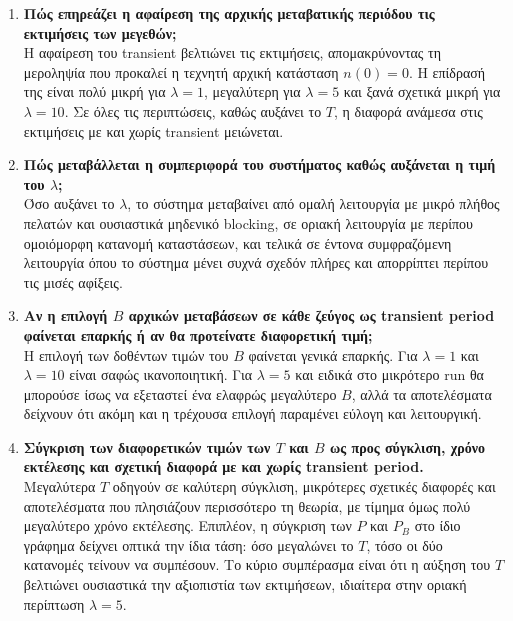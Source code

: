 \documentclass{article}
\begin{document}
\begin{enumerate}[label=\arabic*.]
    \item \textbf{Πώς επηρεάζει η αφαίρεση της αρχικής μεταβατικής περιόδου τις εκτιμήσεις των μεγεθών;}\\
    Η αφαίρεση του transient βελτιώνει τις εκτιμήσεις, απομακρύνοντας τη μεροληψία που προκαλεί η τεχνητή αρχική κατάσταση $n(0)=0$. Η επίδρασή της είναι πολύ μικρή για $\lambda=1$, μεγαλύτερη για $\lambda=5$ και ξανά σχετικά μικρή για $\lambda=10$. Σε όλες τις περιπτώσεις, καθώς αυξάνει το $T$, η διαφορά ανάμεσα στις εκτιμήσεις με και χωρίς transient μειώνεται.

    \item \textbf{Πώς μεταβάλλεται η συμπεριφορά του συστήματος καθώς αυξάνεται η τιμή του $\lambda$;}\\
    Όσο αυξάνει το $\lambda$, το σύστημα μεταβαίνει από ομαλή λειτουργία με μικρό πλήθος πελατών και ουσιαστικά μηδενικό blocking, σε οριακή λειτουργία με περίπου ομοιόμορφη κατανομή καταστάσεων, και τελικά σε έντονα συμφραζόμενη λειτουργία όπου το σύστημα μένει συχνά σχεδόν πλήρες και απορρίπτει περίπου τις μισές αφίξεις.

    \item \textbf{Αν η επιλογή $B$ αρχικών μεταβάσεων σε κάθε ζεύγος ως transient period φαίνεται επαρκής ή αν θα προτείνατε διαφορετική τιμή;}\\
    Η επιλογή των δοθέντων τιμών του $B$ φαίνεται γενικά επαρκής. Για $\lambda=1$ και $\lambda=10$ είναι σαφώς ικανοποιητική. Για $\lambda=5$ και ειδικά στο μικρότερο run θα μπορούσε ίσως να εξεταστεί ένα ελαφρώς μεγαλύτερο $B$, αλλά τα αποτελέσματα δείχνουν ότι ακόμη και η τρέχουσα επιλογή παραμένει εύλογη και λειτουργική.

    \item \textbf{Σύγκριση των διαφορετικών τιμών των $T$ και $B$ ως προς σύγκλιση, χρόνο εκτέλεσης και σχετική διαφορά με και χωρίς transient period.}\\
    Μεγαλύτερα $T$ οδηγούν σε καλύτερη σύγκλιση, μικρότερες σχετικές διαφορές και αποτελέσματα που πλησιάζουν περισσότερο τη θεωρία, με τίμημα όμως πολύ μεγαλύτερο χρόνο εκτέλεσης. Επιπλέον, η σύγκριση των $P$ και $P_B$ στο ίδιο γράφημα δείχνει οπτικά την ίδια τάση: όσο μεγαλώνει το $T$, τόσο οι δύο κατανομές τείνουν να συμπέσουν. Το κύριο συμπέρασμα είναι ότι η αύξηση του $T$ βελτιώνει ουσιαστικά την αξιοπιστία των εκτιμήσεων, ιδιαίτερα στην οριακή περίπτωση $\lambda=5$.
\end{enumerate}
\end{document}
